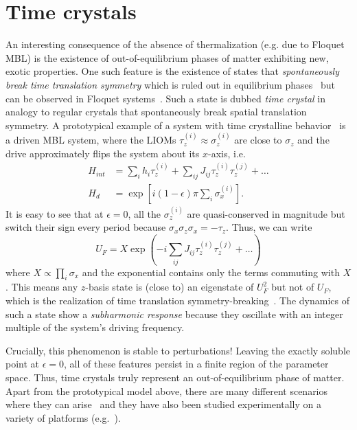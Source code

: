 \section{Time crystals}
An interesting consequence of the absence of thermalization (e.g. due to Floquet MBL) is the existence of out-of-equilibrium phases of matter exhibiting new, exotic properties. One such feature is the existence of states that \emph{spontaneously break time translation symmetry} which is ruled out in equilibrium phases~\cite{watanabeAbsenceQuantumTime2015} but can be observed in Floquet systems~\cite{vonkeyserlingkAbsoluteStabilitySpatiotemporal2016,elsePrethermalPhasesMatter2017,khemaniBriefHistoryTime2019,elseDiscreteTimeCrystals2020a}. Such a state is dubbed \emph{time crystal} in analogy to regular crystals that spontaneously break spatial translation symmetry. A prototypical example of a system with time crystalline behavior~\cite{elseFloquetTimeCrystals2016,elseDiscreteTimeCrystals2020a} is a driven MBL system, where the LIOMs $\tau_z^{(i)}\approx\sigma_z^{(i)}$ are close to $\sigma_z$ and the drive approximately flips the system about its $x$-axis, i.e.
\begin{align}
	H_{int} &= \sum_i h_i \tau_z^{(i)} + \sum_{ij} J_{ij}\tau_z^{(i)}\tau_z^{(j)}+\ldots\\
	H_{d}&=\exp\left[i(1-\epsilon)\pi\sum_i \sigma_x^{(i)}\right].
\end{align}
It is easy to see that at $\epsilon=0$, all the $\sigma_z^{(i)}$ are quasi-conserved in magnitude but switch their sign every period because $\sigma_x \sigma_z \sigma_x = -\tau_z$. Thus, we can write
\begin{equation}
	U_F = X\exp(-i\sum_{ij} J_{ij}\tau_z^{(i)}\tau_z^{(j)} + \ldots )
\end{equation}
where $X\propto\prod_i \sigma_x$ and the exponential contains only the terms commuting with $X$. This means any $z$-basis state is (close to) an eigenstate of $U_F^2$ but not of $U_F$, which is the realization of time translation symmetry-breaking~\cite{elseFloquetTimeCrystals2016}. The dynamics of such a state show a \emph{subharmonic response} because they oscillate with an integer multiple of the system's driving frequency.

Crucially, this phenomenon is stable to perturbations! Leaving the exactly soluble point at $\epsilon=0$, all of these features persist in a finite region of the parameter space. Thus, time crystals truly represent an out-of-equilibrium phase of matter. Apart from the prototypical model above, there are many different scenarios where they can arise~\cite{khemaniBriefHistoryTime2019,elseDiscreteTimeCrystals2020a} and they have also been studied experimentally on a variety of platforms (e.g.~\cite{choiObservationDiscreteTimecrystalline2017,miTimeCrystallineEigenstateOrder2021,ippolitiManybodyPhysicsNISQ2021,randallManybodyLocalizedDiscrete2021}).
	

